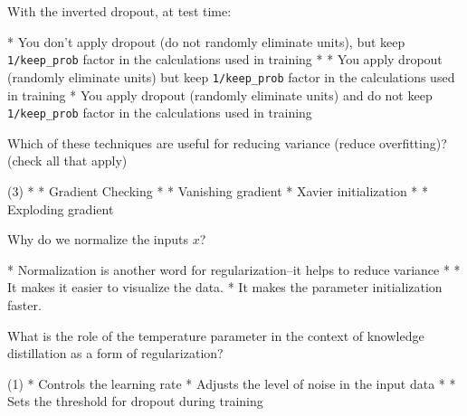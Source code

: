 \documentclass[10pt]{extarticle}
\begin{document}
\begin{exercise}
    With the inverted dropout, at test time:
    \begin{choice}
        * You don't apply dropout (do not randomly eliminate units), but keep \texttt{1/keep\_prob} factor in the calculations used in training
        * 
        * You apply dropout (randomly eliminate units) but keep \texttt{1/keep\_prob} factor in the calculations used in training
        * You apply dropout (randomly eliminate units) and do not keep \texttt{1/keep\_prob} factor in the calculations used in training
    \end{choice}
\end{exercise}
\begin{solution}
\end{solution}

\begin{exercise}
    Which of these techniques are useful for reducing variance (reduce overfitting)? (check all that apply)
    \begin{choice} (3)
        * 
        * Gradient Checking
        * 
        * Vanishing gradient
        * Xavier initialization
        * 
        * Exploding gradient
    \end{choice}
\end{exercise}
\begin{solution}
\end{solution}

\begin{exercise}
    Why do we normalize the inputs \(x\)?
    \begin{choice}
        * Normalization is another word for regularization--it helps to reduce variance
        * 
        * It makes it easier to visualize the data.
        * It makes the parameter initialization faster.
    \end{choice}
\end{exercise}
\begin{solution}
\end{solution}


\begin{exercise}
    What is the role of the temperature parameter in the context of knowledge distillation as a form of regularization?
    \begin{choice} (1)
        * Controls the learning rate
        * Adjusts the level of noise in the input data
        * 
        * Sets the threshold for dropout during training
    \end{choice}
\end{exercise}
\begin{solution}
\end{solution}
\end{document}
